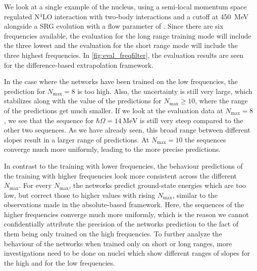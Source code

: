 We look at a single example of the  nucleus, using a semi-local momentum space regulated N$^{4}$LO interaction with two-body interactions and a cutoff at \SI{450}{\mega\electronvolt} alongside a SRG evolution with a flow parameter of . Since there are six frequencies available, the evaluation for the long range training mode will include the three lowest and the evaluation for the short range mode will include the three highest frequencies. In \autoref{fig:eval_freqfilter}, the evaluation results are seen for the difference-based extrapolation framework.

In the case where the networks have been trained on the low frequencies, the prediction for $N_\mathrm{max} = 8$ is too high. Also, the uncertainty is still very large, which stabilizes along with the value of the predictions for $N_\mathrm{max} \geq 10$, where the range of the predictions get much smaller. If we look at the evaluation data at $N_\mathrm{max} = 8$, we see that the sequence for $\hbar\Omega = \SI{14}{\mega\electronvolt}$ is still very steep compared to the other two sequences. As we have already seen, this broad range between different slopes result in a larger range of predictions. At $N_\mathrm{max} = 10$ the sequences converge much more uniformly, leading to the more precise predictions.

In contrast to the training with lower frequencies, the behaviour predictions of the training with higher frequencies look more consistent across the different $N_\mathrm{max}$. For every $N_\mathrm{max}$, the networks predict ground-state energies which are too low, but correct those to higher values with rising $N_\mathrm{max}$, similar to the observations made in the absolute-based framework. Here, the sequences of the higher frequencies converge much more uniformly, which is the reason we cannot confidentially attribute the precision of the networks prediction to the fact of them being only trained on the high frequencies. To further analyze the behaviour of the networks when trained only on short or long ranges, more investigations need to be done on nuclei which show different ranges of slopes for the high and for the low frequencies.
